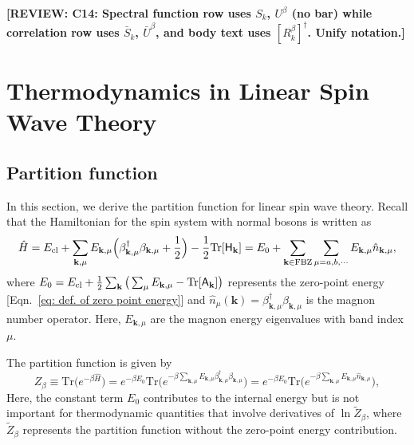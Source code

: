 \documentclass[aps, prx, nofootinbib, superscriptaddress]{revtex4-2}
\newcommand{\REVIEW}[1]{{\color{reviewcolor}\bfseries [REVIEW: #1]}}
\newcommand{\kvec}{\mathbf{k}}
\newcommand{\Tr}{\mathrm{Tr}}
\begin{document}
\REVIEW{C14: Spectral function row uses $S_k$, $U^\beta$ (no bar) while correlation row uses $\bar{S}_k$, $\bar{U}^\beta$, and body text uses $[R^\beta_k]^\dagger$. Unify notation.}









\newpage
\section{Thermodynamics in Linear Spin Wave Theory}

\subsection{Partition function}\label{subsec: Partition Function}
In this section, we derive the partition function for linear spin wave theory. 
Recall that the Hamiltonian for the spin system with normal bosons is written as 
\begin{align}
    \hat{H} = E_{\rm cl} + \sum_{\kvec, \mu} E_{\kvec, \mu} \Big( \beta^{\dagger}_{\kvec, \mu} \beta_{\kvec, \mu} + \frac{1}{2} \Big) - \frac{1}{2} \Tr [\mathsf{H}_{\kvec}] 
    = E_{0} + \sum_{\kvec \in \mathrm{FBZ}} \sum_{\mu = a, b, \cdots} E_{\kvec, \mu} \hat{n}_{\kvec, \mu},
\end{align}
where $E_{0} = E_{\rm cl} + \frac{1}{2} \sum_{\kvec} \big( \sum_{\mu} E_{\kvec, \mu} - \Tr [\mathsf{A}_{\kvec}] \big)$ represents the zero-point energy [Eqn.~\eqref{eq: def. of zero point energy}] and $\hat{n}_{\mu}(\kvec) = \beta^{\dagger}_{\kvec, \mu} \beta_{\kvec, \mu}$ is the magnon number operator. Here, $E_{\kvec, \mu}$ are the magnon energy eigenvalues with band index $\mu$.

The partition function is given by
\begin{equation}
    Z_{\beta} \equiv \Tr \big( e^{- \beta \hat{H}} \big) 
    = e^{- \beta E_{0}}  \Tr \big( e^{- \beta \sum_{\kvec, \mu} E_{\kvec, \mu} \beta^{\dagger}_{\kvec, \mu} \beta_{\kvec, \mu}} \big) 
    = e^{- \beta E_{0}} \Tr \big( e^{- \beta \sum_{\kvec, \mu} E_{\kvec, \mu} \hat{n}_{\kvec, \mu}} \big),
\end{equation}
Here, the constant term $E_0$ contributes to the internal energy but is not important for thermodynamic quantities that involve derivatives of $\ln \tilde{Z}_{\beta}$, where $\tilde{Z}_{\beta}$ represents the partition function without the zero-point energy contribution.
\end{document}
